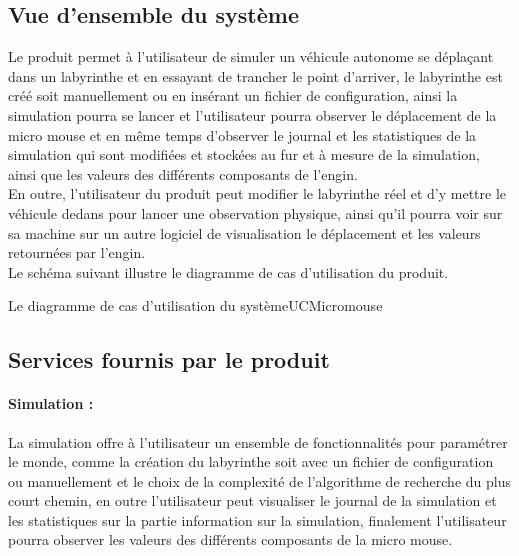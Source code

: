\subsection{Vue d’ensemble du système} \label{sec:vueEns}

\vspace{5mm}
Le produit permet à l'utilisateur de simuler un véhicule autonome se déplaçant 
dans un labyrinthe et en essayant de trancher le point d'arriver, le labyrinthe 
est créé soit manuellement ou en insérant un fichier de configuration, ainsi la 
simulation pourra se lancer et l'utilisateur pourra observer le déplacement de 
la micro mouse et en même temps d'observer le journal et les statistiques de la 
simulation qui sont modifiées et stockées au fur et à mesure de la simulation, 
ainsi que les valeurs des différents composants de l'engin. \\

En outre, l'utilisateur du produit peut modifier le labyrinthe réel et d'y mettre 
le véhicule dedans pour lancer une observation physique, ainsi qu'il pourra voir 
sur sa machine sur un autre logiciel de visualisation le déplacement et les valeurs 
retournées par l'engin. \\

Le schéma suivant illustre le diagramme de cas d'utilisation du produit.


{Le diagramme de cas d'utilisation du système}{UCMicromouse}

\subsection{Services fournis par le produit} \label{sec:serLogiciel}

\paragraph{Simulation :}La simulation offre à l'utilisateur un ensemble de fonctionnalités 
pour paramétrer le monde, comme la création du labyrinthe soit avec un fichier de configuration 
ou manuellement et le choix de la complexité de l'algorithme de recherche du plus court chemin, 
en outre l'utilisateur peut visualiser le journal de la simulation et les statistiques sur la 
partie information sur la simulation, finalement l'utilisateur pourra observer les valeurs des 
différents composants de la micro mouse.



